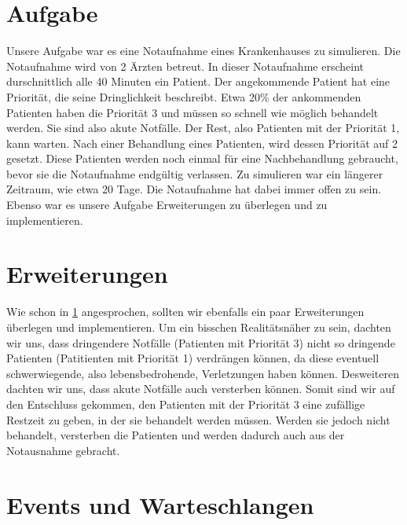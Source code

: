 \documentclass[12pt,fleqn,a4paper]{article}
\begin{document}
\section{Aufgabe}\label{sec:Aufgabe}
Unsere Aufgabe war es eine Notaufnahme eines Krankenhauses zu simulieren. Die Notaufnahme wird von 2 \"{A}rzten betreut. In dieser Notaufnahme erscheint durschnittlich alle 40 Minuten ein Patient. Der angekommende Patient hat eine Priorit\"{a}t, die seine Dringlichkeit beschreibt. Etwa 20\% der ankommenden Patienten haben die Priorit\"{a}t 3 und m\"{u}ssen so schnell wie m\"{o}glich behandelt werden. Sie sind also akute Notf\"{a}lle. Der Rest, also Patienten mit der Priorit\"{a}t 1, kann warten. Nach einer Behandlung eines Patienten, wird dessen Priorit\"{a}t auf 2 gesetzt. Diese Patienten werden noch einmal f\"{u}r eine Nachbehandlung gebraucht, bevor sie die Notaufnahme endg\"{u}ltig verlassen.
Zu simulieren war ein l\"{a}ngerer Zeitraum, wie etwa 20 Tage. Die Notaufnahme hat dabei immer offen zu sein.
Ebenso war es unsere Aufgabe Erweiterungen zu \"{u}berlegen und zu implementieren.

\section{Erweiterungen}
Wie schon in \ref{sec:Aufgabe} angesprochen, sollten wir ebenfalls ein paar Erweiterungen \"{u}berlegen und implementieren. Um ein bisschen Realit\"{a}tsn\"{a}her zu sein, dachten wir uns, dass dringendere Notf\"{a}lle (Patienten mit Priorit\"{a}t 3) nicht so dringende Patienten (Patitienten mit Priorit\"{a}t 1) verdr\"{a}ngen k\"{o}nnen, da diese eventuell schwerwiegende, also lebensbedrohende, Verletzungen haben k\"{o}nnen.
Desweiteren dachten wir uns, dass akute Notf\"{a}lle auch versterben k\"{o}nnen. Somit sind wir auf den Entschluss gekommen, den Patienten mit der Priorit\"{a}t 3 eine zuf\"{a}llige Restzeit zu geben, in der sie behandelt werden m\"{u}ssen. Werden sie jedoch nicht behandelt, versterben die Patienten und werden dadurch auch aus der Notausnahme gebracht.

\section{Events und Warteschlangen}
\end{document}
